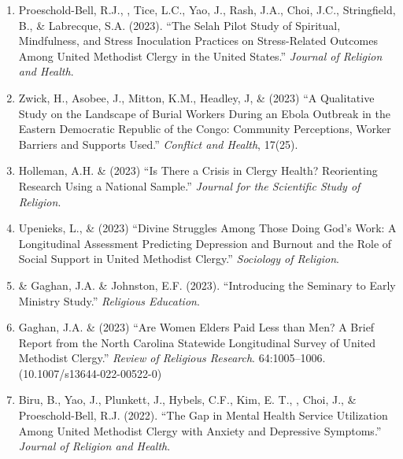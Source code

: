 \begin{enumerate}
\item Proeschold-Bell, R.J., \Eagle, Tice, L.C., Yao, J., Rash, J.A., Choi, J.C., Stringfield, B., \& Labrecque, S.A. (2023). ``The Selah Pilot Study of Spiritual, Mindfulness, and Stress Inoculation Practices on Stress-Related Outcomes Among United Methodist Clergy in the United States.'' \textit{Journal of Religion and Health}. 
	
\item Zwick, H., Asobee, J., Mitton, K.M., Headley, J, \& \Eagle\CS \hspace{0.1em} (2023) ``A Qualitative Study on the Landscape of Burial Workers During an Ebola Outbreak in the Eastern Democratic Republic of the Congo: Community Perceptions, Worker Barriers and Supports Used.''  \textit{Conflict and Health}, 17(25). 

\item Holleman, A.H. \& \Eagle\hspace{.01em} (2023) ``Is There a Crisis in Clergy Health? Reorienting Research Using a National Sample.'' \textit{Journal for the Scientific Study of Religion}. 

\item Upenieks, L., \& \Eagle\hspace{0.1em} (2023) ``Divine Struggles Among Those Doing God’s Work: A Longitudinal Assessment Predicting Depression and Burnout and the Role of Social Support in United Methodist Clergy.'' \textit{Sociology of Religion}.  

\item \Eagle \hspace{.01em} \& Gaghan, J.A. \& Johnston, E.F. (2023). ``Introducing the Seminary to Early Ministry Study.''  \textit{Religious Education}. 

\item Gaghan, J.A. \& \Eagle \hspace{0.1em} (2023) ``Are Women Elders Paid Less than Men? A Brief Report from the North Carolina Statewide Longitudinal Survey of United Methodist Clergy.'' \textit{Review of Religious Research}. 64:1005--1006. \doi(10.1007/s13644-022-00522-0)
	
\item Biru, B., Yao, J., Plunkett, J., Hybels, C.F., Kim, E. T., \Eagle, Choi, J., \& Proeschold-Bell, R.J. (2022). ``The Gap in Mental Health Service Utilization Among United Methodist Clergy with Anxiety and Depressive Symptoms.'' \emph{Journal of Religion and Health}. 


\end{enumerate}
